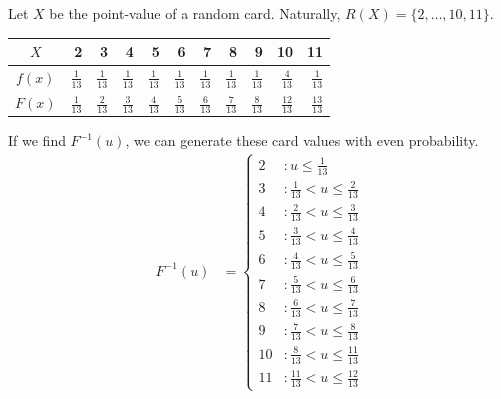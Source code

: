                     Let $X$ be the point-value of a random card.
                    Naturally, $R(X) = \{ 2, \ldots, 10, 11 \}$.
                    \begin{table}[h]
                        \centering
                        \begin{tabular}{ | c || r | r | r | r | r | r | r | r | r | r |}
                            \hline
                            $X$ & 2 & 3 & 4 & 5 & 6 & 7 & 8 & 9 & 10 & 11 \\ \hline \hline
                            $f(x)$ & $\frac{1}{13}$ & $\frac{1}{13}$ & $\frac{1}{13}$ & $\frac{1}{13}$ & $\frac{1}{13}$ & $\frac{1}{13} $& $\frac{1}{13}$ & $\frac{1}{13}$ & $\frac{4}{13}$ & $\frac{1}{13}$ \\ \hline
                            $F(x)$ & $\frac{1}{13}$ & $\frac{2}{13}$ & $\frac{3}{13}$ & $\frac{4}{13}$ & $\frac{5}{13}$ & $\frac{6}{13} $& $\frac{7}{13}$ & $\frac{8}{13}$ & $\frac{12}{13}$ & $\frac{13}{13}$ \\ \hline
                        \end{tabular}
                    \end{table}

                    If we find $F^{-1}(u)$, we can generate these card values with even probability.
                    \begin{align*}
                        F^{-1}(u) &=
                            \left\{
                                \begin{array}{lr}
                                    2 &  : u \le \frac{1}{13} \\
                                    3 &  : \frac{1}{13} < u \le \frac{2}{13} \\
                                    4 &  : \frac{2}{13} < u \le \frac{3}{13} \\
                                    5 &  : \frac{3}{13} < u \le \frac{4}{13} \\
                                    6 &  : \frac{4}{13} < u \le \frac{5}{13} \\
                                    7 &  : \frac{5}{13} < u \le \frac{6}{13} \\
                                    8 &  : \frac{6}{13} < u \le \frac{7}{13} \\
                                    9 &  : \frac{7}{13} < u \le \frac{8}{13} \\
                                    10 & : \frac{8}{13} < u \le \frac{11}{13} \\
                                    11 & : \frac{11}{13} < u \le \frac{12}{13}
                                \end{array}
                            \right.
                    \end{align*}


